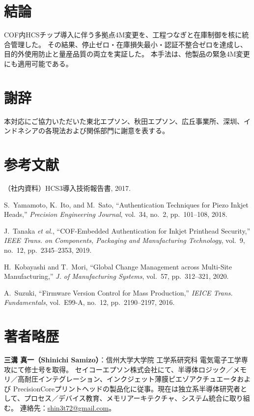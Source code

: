 \documentclass[journal,twocolumn]{IEEEtran}
\begin{document}
\section{結論}
COF内HCSチップ導入に伴う多拠点4M変更を、工程つなぎと在庫制御を核に統合管理した。
その結果、停止ゼロ・在庫損失最小・認証不整合ゼロを達成し、目的外使用防止と量産品質の両立を実証した。
本手法は、他製品の緊急4M変更にも適用可能である。

\section*{謝辞}
本対応にご協力いただいた東北エプソン、秋田エプソン、広丘事業所、深圳、インドネシアの各現法および関係部門に謝意を表する。

\section*{参考文献}
\begin{thebibliography}{99}
（社内資料）HCS3導入技術報告書, 2017.

S.~Yamamoto, K.~Ito, and M.~Sato, ``Authentication Techniques for Piezo Inkjet Heads,'' \emph{Precision Engineering Journal}, vol.~34, no.~2, pp.~101--108, 2018.

J.~Tanaka \emph{et al.}, ``COF-Embedded Authentication for Inkjet Printhead Security,'' \emph{IEEE Trans. on Components, Packaging and Manufacturing Technology}, vol.~9, no.~12, pp.~2345--2353, 2019.

H.~Kobayashi and T.~Mori, ``Global Change Management across Multi-Site Manufacturing,'' \emph{J. of Manufacturing Systems}, vol.~57, pp.~312--321, 2020.

A.~Suzuki, ``Firmware Version Control for Mass Production,'' \emph{IEICE Trans. Fundamentals}, vol.~E99-A, no.~12, pp.~2190--2197, 2016.
\end{thebibliography}

\section*{著者略歴}
\noindent\textbf{三溝 真一（Shinichi Samizo）}：信州大学大学院 工学系研究科 電気電子工学専攻にて修士号を取得。
セイコーエプソン株式会社にて、半導体ロジック／メモリ／高耐圧インテグレーション、インクジェット薄膜ピエゾアクチュエータおよび
PrecisionCoreプリントヘッドの製品化に従事。現在は独立系半導体研究者として、プロセス／デバイス教育、メモリアーキテクチャ、システム統合に取り組む。
連絡先：\href{mailto:shin3t72@gmail.com}{shin3t72@gmail.com}。
\end{document}
